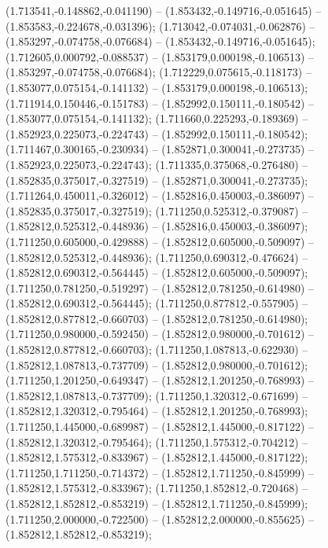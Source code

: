  (1.713541,-0.148862,-0.041190) -- (1.853432,-0.149716,-0.051645) -- (1.853583,-0.224678,-0.031396);
 (1.713042,-0.074031,-0.062876) -- (1.853297,-0.074758,-0.076684) -- (1.853432,-0.149716,-0.051645);
 (1.712605,0.000792,-0.088537) -- (1.853179,0.000198,-0.106513) -- (1.853297,-0.074758,-0.076684);
 (1.712229,0.075615,-0.118173) -- (1.853077,0.075154,-0.141132) -- (1.853179,0.000198,-0.106513);
 (1.711914,0.150446,-0.151783) -- (1.852992,0.150111,-0.180542) -- (1.853077,0.075154,-0.141132);
 (1.711660,0.225293,-0.189369) -- (1.852923,0.225073,-0.224743) -- (1.852992,0.150111,-0.180542);
 (1.711467,0.300165,-0.230934) -- (1.852871,0.300041,-0.273735) -- (1.852923,0.225073,-0.224743);
 (1.711335,0.375068,-0.276480) -- (1.852835,0.375017,-0.327519) -- (1.852871,0.300041,-0.273735);
 (1.711264,0.450011,-0.326012) -- (1.852816,0.450003,-0.386097) -- (1.852835,0.375017,-0.327519);
 (1.711250,0.525312,-0.379087) -- (1.852812,0.525312,-0.448936) -- (1.852816,0.450003,-0.386097);
 (1.711250,0.605000,-0.429888) -- (1.852812,0.605000,-0.509097) -- (1.852812,0.525312,-0.448936);
 (1.711250,0.690312,-0.476624) -- (1.852812,0.690312,-0.564445) -- (1.852812,0.605000,-0.509097);
 (1.711250,0.781250,-0.519297) -- (1.852812,0.781250,-0.614980) -- (1.852812,0.690312,-0.564445);
 (1.711250,0.877812,-0.557905) -- (1.852812,0.877812,-0.660703) -- (1.852812,0.781250,-0.614980);
 (1.711250,0.980000,-0.592450) -- (1.852812,0.980000,-0.701612) -- (1.852812,0.877812,-0.660703);
 (1.711250,1.087813,-0.622930) -- (1.852812,1.087813,-0.737709) -- (1.852812,0.980000,-0.701612);
 (1.711250,1.201250,-0.649347) -- (1.852812,1.201250,-0.768993) -- (1.852812,1.087813,-0.737709);
 (1.711250,1.320312,-0.671699) -- (1.852812,1.320312,-0.795464) -- (1.852812,1.201250,-0.768993);
 (1.711250,1.445000,-0.689987) -- (1.852812,1.445000,-0.817122) -- (1.852812,1.320312,-0.795464);
 (1.711250,1.575312,-0.704212) -- (1.852812,1.575312,-0.833967) -- (1.852812,1.445000,-0.817122);
 (1.711250,1.711250,-0.714372) -- (1.852812,1.711250,-0.845999) -- (1.852812,1.575312,-0.833967);
 (1.711250,1.852812,-0.720468) -- (1.852812,1.852812,-0.853219) -- (1.852812,1.711250,-0.845999);
 (1.711250,2.000000,-0.722500) -- (1.852812,2.000000,-0.855625) -- (1.852812,1.852812,-0.853219);
